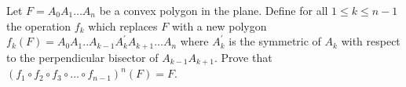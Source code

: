 Let \(F = A_0 A_1 \dots A_n\) be a convex polygon in the plane. Define for all \(1 \leq k \leq n-1\) the operation \(f_k\) which replaces \(F\) with a new polygon \(f_k(F)=A_0A_1..A_{k-1}A_k^\prime A_{k+1} \dots A_n\) where \(A_k^\prime\) is the symmetric of \(A_k\) with respect to the perpendicular bisector of \(A_{k-1}A_{k+1}\). Prove that \((f_1 \circ f_2 \circ f_3 \circ\dots\circ f_{n-1})^n(F)=F\).